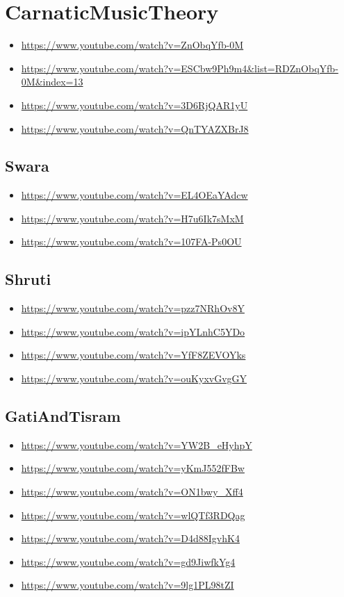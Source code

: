 \noindent
\section{CarnaticMusicTheory}
\label{sec:orga13830d}
\begin{itemize}
\item \url{https://www.youtube.com/watch?v=ZnObqYfb-0M}
\item \url{https://www.youtube.com/watch?v=ESCbw9Ph9m4\&list=RDZnObqYfb-0M\&index=13}
\item \url{https://www.youtube.com/watch?v=3D6RjQAR1yU}
\item \url{https://www.youtube.com/watch?v=QnTYAZXBrJ8}
\end{itemize}

\subsection{Swara}
\label{sec:org2a8b2cf}
\begin{itemize}
\item \url{https://www.youtube.com/watch?v=EL4OEaYAdcw}
\item \url{https://www.youtube.com/watch?v=H7u6Ik7sMxM}
\item \url{https://www.youtube.com/watch?v=107FA-Ps0OU}
\end{itemize}

\subsection{Shruti}
\label{sec:orge097de9}
\begin{itemize}
\item \url{https://www.youtube.com/watch?v=pzz7NRhOv8Y}
\item \url{https://www.youtube.com/watch?v=ipYLnhC5YDo}
\item \url{https://www.youtube.com/watch?v=YfF8ZEVOYks}
\item \url{https://www.youtube.com/watch?v=ouKyxvGvgGY}
\end{itemize}

\subsection{GatiAndTisram}
\label{sec:org9337233}
\begin{itemize}
\item \url{https://www.youtube.com/watch?v=YW2B\_eHyhpY}
\item \url{https://www.youtube.com/watch?v=yKmJ552fFBw}
\item \url{https://www.youtube.com/watch?v=ON1bwy\_Xff4}
\item \url{https://www.youtube.com/watch?v=wlQTf3RDQag}
\item \url{https://www.youtube.com/watch?v=D4d88IgvhK4}
\item \url{https://www.youtube.com/watch?v=gd9JiwfkYg4}
\item \url{https://www.youtube.com/watch?v=9lg1PL98tZI}
\end{itemize}


